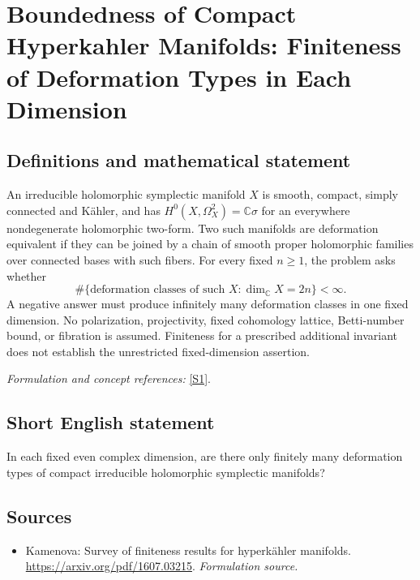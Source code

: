 \documentclass[11pt]{article}
\begin{document}
\section*{\texorpdfstring{Boundedness of Compact Hyperkahler Manifolds: Finiteness of Deformation Types in Each Dimension}{Boundedness of Compact Hyperkahler Manifolds: Finiteness of Deformation Types in Each Dimension}}\label{421}
\subsection{Definitions and mathematical statement}
An irreducible holomorphic symplectic manifold $X$ is smooth, compact, simply connected and K\"ahler, and has $H^0(X,\Omega_X^2)={\mathbb{C}}\sigma$ for an everywhere nondegenerate holomorphic two-form. Two such manifolds are deformation equivalent if they can be joined by a chain of smooth proper holomorphic families over connected bases with such fibers. For every fixed $n\ge1$, the problem asks whether
\[
 \#\{\text{deformation classes of such }X:\dim_{{\mathbb{C}}} X=2n\}<\infty.
\]
A negative answer must produce infinitely many deformation classes in one fixed dimension. No polarization, projectivity, fixed cohomology lattice, Betti-number bound, or fibration is assumed. Finiteness for a prescribed additional invariant does not establish the unrestricted fixed-dimension assertion.
\par\smallskip\textit{Formulation and concept references:} \href{https://arxiv.org/pdf/1607.03215}{[S1]}.

\subsection{Short English statement}
In each fixed even complex dimension, are there only finitely many deformation types of compact irreducible holomorphic symplectic manifolds?
\subsection{Sources}
\begin{itemize}
\item[S1]Kamenova: Survey of finiteness results for hyperkähler manifolds.
\url{https://arxiv.org/pdf/1607.03215}.
\textit{Formulation source.}
\end{itemize}
\end{document}
